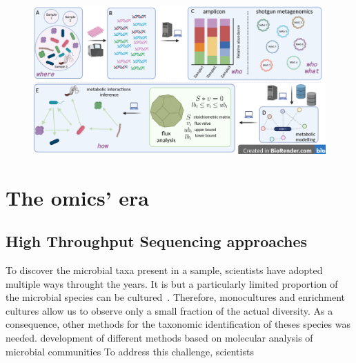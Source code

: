          \begin{figure}[h]
            \centering
            \includegraphics[width=135mm]{figures/Selection_935.png}
            \caption[Reverse ecology approach]{}
         \end{figure}
   
   


      




    


      










\section{The omics' era}

\subsection{High Throughput Sequencing approaches}

   To discover the microbial taxa present in a sample, scientists have 
   adopted multiple ways throught the years. 
   It is but a particularly limited proportion of the microbial species 
   can be cultured~\citeyear{steen2019high}.
   Therefore, monocultures and enrichment cultures allow us to observe 
   only a small fraction of the actual diversity. 
   As a consequence, other methods for the taxonomic identification of theses
   species was needed.
   development of different methods based
   on molecular analysis of microbial communities 
   To address this challenge, scientists 


